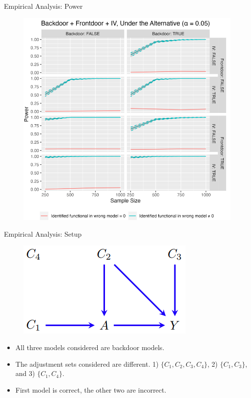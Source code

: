 \documentclass{beamer}
\begin{document}
\begin{frame}{Empirical Analysis: Power}
	\begin{figure}
		\center
		\includegraphics[scale=0.3]{power.png}
	\end{figure}
\end{frame}

\begin{frame}{Empirical Analysis: Setup}
	\begin{figure}
		\center
		\includegraphics[scale=0.3]{empirical_dag.png}
	\end{figure}
	\begin{itemize}
		\item All three models considered are backdoor models.
		\item The adjustment sets considered are different. 1) $ \{ C_1, C_2, C_3, C_4 \} $, 2) $ \{ C_1, C_3 \} $, and 3) $ \{ C_1, C_4 \} $.
		\item First model is correct, the other two are incorrect.
	\end{itemize}
\end{frame}
\end{document}
